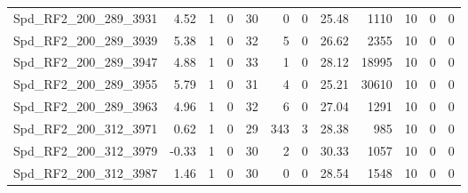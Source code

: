 \begin{longtable}[c]{@{}lrrrrrrrrrrr@{}}
Spd\_RF2\_200\_289\_3931     & 4.52                   & 1                       & 0                       & 30                     & 0                       & 0                       & 25.48                   & 1110                     & 10                       & 0                        & 0                        \\
Spd\_RF2\_200\_289\_3939     & 5.38                   & 1                       & 0                       & 32                     & 5                       & 0                       & 26.62                   & 2355                     & 10                       & 0                        & 0                        \\
Spd\_RF2\_200\_289\_3947     & 4.88                   & 1                       & 0                       & 33                     & 1                       & 0                       & 28.12                   & 18995                    & 10                       & 0                        & 0                        \\
Spd\_RF2\_200\_289\_3955     & 5.79                   & 1                       & 0                       & 31                     & 4                       & 0                       & 25.21                   & 30610                    & 10                       & 0                        & 0                        \\
Spd\_RF2\_200\_289\_3963     & 4.96                   & 1                       & 0                       & 32                     & 6                       & 0                       & 27.04                   & 1291                     & 10                       & 0                        & 0                        \\
Spd\_RF2\_200\_312\_3971     & 0.62                   & 1                       & 0                       & 29                     & 343                     & 3                       & 28.38                   & 985                      & 10                       & 0                        & 0                        \\
Spd\_RF2\_200\_312\_3979     & -0.33                  & 1                       & 0                       & 30                     & 2                       & 0                       & 30.33                   & 1057                     & 10                       & 0                        & 0                        \\
Spd\_RF2\_200\_312\_3987     & 1.46                   & 1                       & 0                       & 30                     & 0                       & 0                       & 28.54                   & 1548                     & 10                       & 0                        & 0                        \\

\end{longtable}
